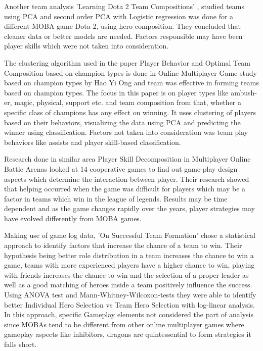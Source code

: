 \documentclass[conference]{IEEEtran}
\begin{document}
Another team analysis 'Learning Dota 2 Team Compositions' \cite{Agarwala2014}, studied teams using PCA and second order PCA with Logistic regression was done for a different MOBA game Dota 2, using hero composition. They concluded that cleaner data or better models are needed. Factors responsible may have been player skills which were not taken into consideration.

The clustering algorithm used in the paper Player Behavior and Optimal Team Composition based on champion types is done in Online Multiplayer Game study based on champion types by Hao Yi Ong and team \cite{Bainbridge2009} was effective in forming teams based on champion types. The focus in this paper is on player types like ambush-er, magic, physical, support etc. and team composition from that, whether a specific class of champions has any effect on winning. It uses clustering of players based on their behaviors, visualizing the data using PCA and predicting the winner using classification. Factors not taken into consideration was team play behaviors like assists and player skill-based classification.

Research done in similar area  Player Skill Decomposition in Multiplayer Online Battle Arenas \cite{Chen2016} looked at 14 cooperative games to find out game-play design aspects which determine the interaction between player. Their research showed that helping occurred when the game was difficult for players which may be a factor in teams which win in the league of legends. Results may be time dependent and as the game changes rapidly over the years, player strategies may have evolved differently from MOBA games. 

Making use of game log data, 'On Successful Team Formation' \cite{Pobiedina2013b} chose a statistical approach to identify factors that increase the chance of a team to win. Their hypothesis being better role distribution in a team increases the chance to win a game,     teams with more experienced players have a higher chance to win, playing with friends increases the chance to win and
the selection of a proper leader as well as a good matching of heroes inside a team positively influence the success. Using ANOVA test and Mann-Whitney-Wilcoxon-tests they were able to identify better Individual Hero Selection vs Team Hero Selection with log-linear analysis. In this approach, specific Gameplay elements not considered the part of analysis since MOBAs tend to be different from other online multiplayer games where gameplay aspects like inhibitors, dragons are quintessential to form strategies it falls short.
  
\end{document}
